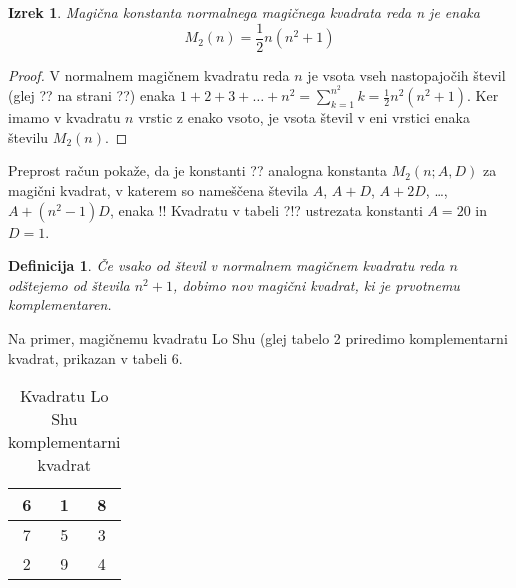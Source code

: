 \documentclass[a4paper,12pt]{article}
\newtheorem{definition}{Definicija}
\newtheorem{theorem}{Izrek}[section]
\begin{document}
\begin{theorem}
   Magična konstanta normalnega magičnega kvadrata reda n
   je enaka
   \begin{equation}
      M_2(n) = \frac{1}{2} n(n^2+1)
   \end{equation}
\end{theorem}

\begin{proof}
   V normalnem magičnem kvadratu reda $n$ je vsota vseh nastopajočih
   števil (glej ?? na strani ??) enaka
   $1+2+3+\dots+n^2=\sum_{k=1}^{n^2}k=\frac{1}{2}n^2(n^2+1)$. Ker imamo
   v kvadratu $n$ vrstic z enako vsoto, je vsota števil v eni vrstici
   enaka številu $M_2(n)$. %
   
\end{proof}

Preprost račun pokaže, da je konstanti ?? analogna konstanta
$M_2(n;A,D)$ za magični kvadrat, v katerem so nameščena števila
$A$, $A+D$, $A+2D$, \dots, $A+(n^2-1)D$, enaka %
!!
Kvadratu v tabeli ?!? ustrezata konstanti $A=20$ in $D=1$.

\begin{definition}

      Če vsako od števil v normalnem magičnem kvadratu reda $n$ odštejemo
      od števila $n^2+1$, dobimo nov magični kvadrat, ki je prvotnemu
      \emph{komplementaren}.
\end{definition}

Na primer, magičnemu kvadratu Lo Shu (glej tabelo 2 priredimo
komplementarni kvadrat, prikazan v tabeli 6.
\begin{table}[h]
   \centering
   \caption{Kvadratu Lo Shu komplementarni kvadrat}
   \label{table:closhu}
   \begin{tabular}{|c|c|c|}
      \hline
      6 & 1 & 8 \\
      \hline
      7 & 5 & 3 \\
      \hline
      2 & 9 & 4 \\
      \hline
    
      \hline

      
   \end{tabular}
   
\end{table}
%
\end{document}
